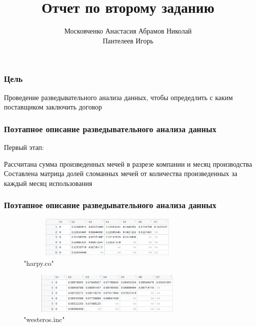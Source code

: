 \documentclass[serif,mathserif]{beamer}
\author[Московченко А. Абрамов Н. Пантелеев И.]{Московченко Анастасия \quad Абрамов Николай\\Пантелеев Игорь }
\title[Отчет\hspace{2em}\insertframenumber/\inserttotalframenumber]{Отчет по второму заданию}
\institute{МГУ им М.В. Ломоносова}
\begin{document}
\maketitle


\begin{frame}
  \frametitle{Цель}
   Проведение разведывательного анализа данных, чтобы опредедлить с каким поставщиком заключить договор
  
\end{frame}


\begin{frame}
  \frametitle{Поэтапное описание разведывательного анализа данных}
  Первый этап: 
  
  Рассчитана сумма произведенных мечей в разрезе компании и месяц производства
  Составлена матрица долей сломанных мечей от количества произведенных за каждый месяц использования
\end{frame}   

\begin{frame}
 \frametitle{Поэтапное описание разведывательного анализа данных}
 \begin{figure}[h]
  \includegraphics[width=90mm,height=20mm]{table1.png}
   \caption{"harpy.co"}
   \label{Table}
   \end{figure}
   \begin{figure}[h]
   \includegraphics[width=90mm,height=20mm]{table2.png}
   \caption{"westeros.inc"}
   \label{Table}
   \end{figure}
  
\end{frame}
\end{document}
